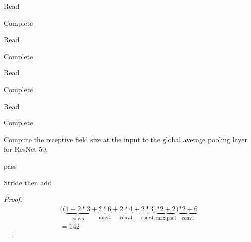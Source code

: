 \documentclass[11pt]{article}
\begin{document}
Read
\begin{solution}
	Complete
\end{solution}

Read
\begin{solution}
	Complete
\end{solution}

Read
\begin{solution}
	Complete
\end{solution}

Read
\begin{solution}
	Complete
\end{solution}

Compute the receptive field size at the input to the global average pooling layer for ResNet 50.

\begin{solution}
	pass
\end{solution}
	Stride then add
\begin{proof}
	\begin{align}
		\bigg(
			\Big(
				\underbrace{1+2*3}_{\text{conv5}}
				+
				\underbrace{2*6}_{\text{conv4}}
				+
				\underbrace{2*4}_{\text{conv4}}
				+
				\underbrace{2*3}_{\text{conv4}}
			\Big)
			\underbrace{*2+2}_{\text{max pool}}
		\bigg)
		\underbrace{*2+6}_{\text{conv1}}
		\\
		=142
	\end{align}
\end{proof}
\end{document}
